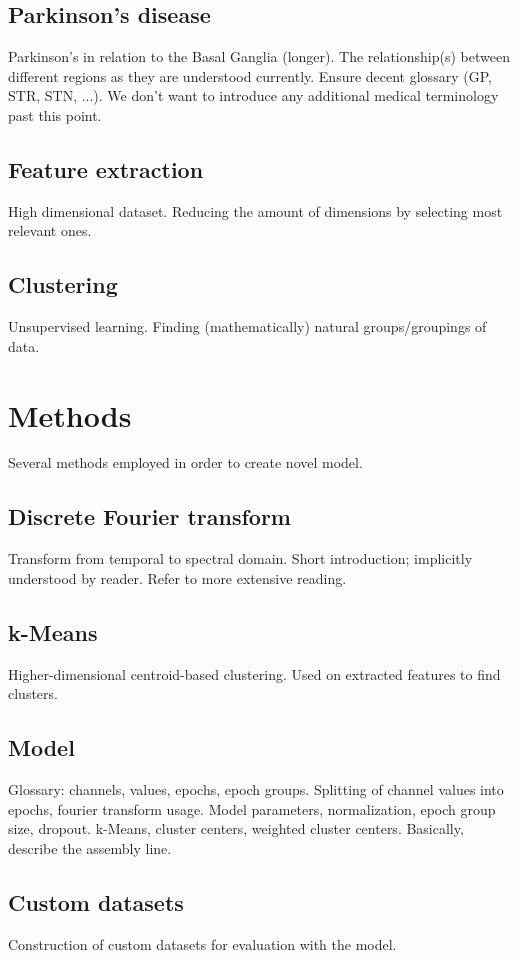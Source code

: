 \documentclass{article}
\begin{document}
\subsection{Parkinson's disease}
Parkinson's in relation to the Basal Ganglia (longer).
The relationship(s) between different regions as they are understood currently.
Ensure decent glossary (GP, STR, STN, ...).
We don't want to introduce any additional medical terminology past this point.

\subsection{Feature extraction}
High dimensional dataset. 
Reducing the amount of dimensions by selecting most relevant ones.

\subsection{Clustering}
Unsupervised learning.
Finding (mathematically) natural groups/groupings of data.

\newpage
\section{Methods}
Several methods employed in order to create novel model.

\subsection{Discrete Fourier transform}
Transform from temporal to spectral domain.
Short introduction; implicitly understood by reader. 
Refer to more extensive reading.

\subsection{k-Means}
Higher-dimensional centroid-based clustering.
Used on extracted features to find clusters.

\subsection{Model}
Glossary: channels, values, epochs, epoch groups.
Splitting of channel values into epochs, fourier transform usage.
Model parameters, normalization, epoch group size, dropout.
k-Means, cluster centers, weighted cluster centers.
Basically, describe the assembly line.

\subsection{Custom datasets}
Construction of custom datasets for evaluation with the model.
\end{document}
